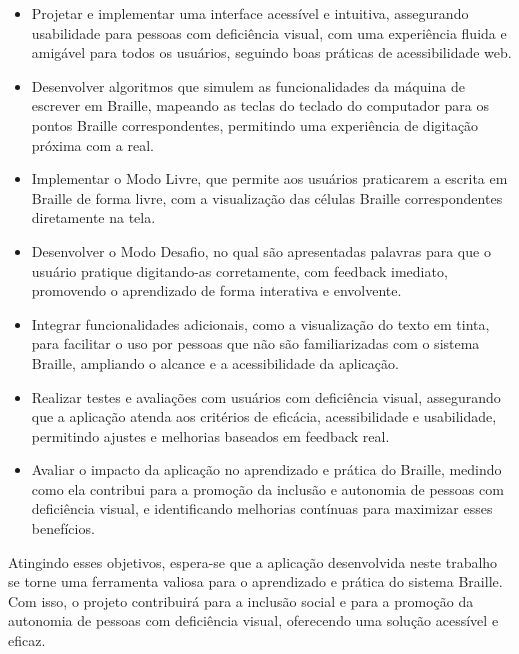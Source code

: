 \begin{itemize}
    \item Projetar e implementar uma interface acessível e intuitiva, assegurando usabilidade para pessoas com deficiência visual, com uma experiência fluida e amigável para todos os usuários, seguindo boas práticas de acessibilidade web.

    \item Desenvolver algoritmos que simulem as funcionalidades da máquina de escrever em Braille, mapeando as teclas do teclado do computador para os pontos Braille correspondentes, permitindo uma experiência de digitação próxima com a real.

    \item Implementar o Modo Livre, que permite aos usuários praticarem a escrita em Braille de forma livre, com a visualização das células Braille correspondentes diretamente na tela.

    \item Desenvolver o Modo Desafio, no qual são apresentadas palavras para que o usuário pratique digitando-as corretamente, com feedback imediato, promovendo o aprendizado de forma interativa e envolvente.

    \item Integrar funcionalidades adicionais, como a visualização do texto em tinta, para facilitar o uso por pessoas que não são familiarizadas com o sistema Braille, ampliando o alcance e a acessibilidade da aplicação.

    \item Realizar testes e avaliações com usuários com deficiência visual, assegurando que a aplicação atenda aos critérios de eficácia, acessibilidade e usabilidade, permitindo ajustes e melhorias baseados em feedback real.

    \item Avaliar o impacto da aplicação no aprendizado e prática do Braille, medindo como ela contribui para a promoção da inclusão e autonomia de pessoas com deficiência visual, e identificando melhorias contínuas para maximizar esses benefícios.

\end{itemize}

Atingindo esses objetivos, espera-se que a aplicação desenvolvida neste trabalho se torne uma ferramenta valiosa para o aprendizado e prática do sistema Braille. Com isso, o projeto contribuirá para a inclusão social e para a promoção da autonomia de pessoas com deficiência visual, oferecendo uma solução acessível e eficaz.

